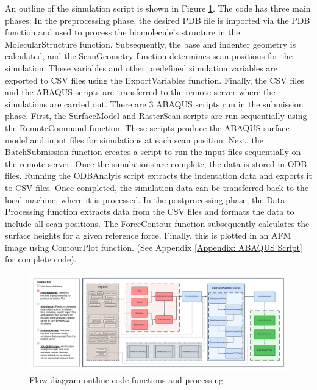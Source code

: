 An outline of the simulation script is shown in Figure \ref{fig: Code Flowchart}. The code has three main phases: In the preprocessing phase, the desired PDB file is imported via the PDB function and used to process the biomolecule's structure in the MolecularStructure function. Subsequently, the base and indenter geometry is calculated, and the ScanGeometry function determines scan positions for the simulation. These variables and other predefined simulation variables are exported to CSV files using the ExportVariables function. Finally, the CSV files and the ABAQUS scripts are transferred to the remote server where the simulations are carried out. There are 3 ABAQUS scripts run in the submission phase. First, the SurfaceModel and RasterScan scripts are run sequentially using the RemoteCommand function. These scripts produce the ABAQUS surface model and input files for simulations at each scan position. Next, the BatchSubmission function creates a script to run the input files sequentially on the remote server. Once the simulations are complete, the data is stored in ODB files. Running the ODBAnalyis script extracts the indentation data and exports it to CSV files. Once completed, the simulation data can be transferred back to the local machine, where it is processed. In the postprocessing phase, the Data Processing function extracts data from the CSV files and formats the data to include all scan positions. The ForceContour function subsequently calculates the surface heights for a given reference force. Finally, this is plotted in an AFM image using ContourPlot function. (See Appendix \ref{Appendix: ABAQUS Script} for complete code).

\begin{figure}[H]
\centering
    \includegraphics[width=1\linewidth]{Figures/AFM Simulation Code Flow chart.pdf}
    \caption{\label{fig: Code Flowchart}Flow diagram outline code functions and processing}
\end{figure}

